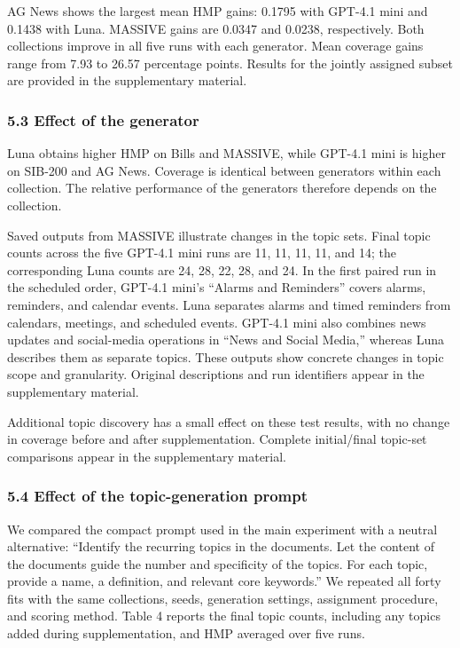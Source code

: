 \documentclass[
  11pt,
  a4paper,
]{article}
\begin{document}
AG News shows the largest mean HMP gains: 0.1795 with GPT-4.1 mini and
0.1438 with Luna. MASSIVE gains are 0.0347 and 0.0238, respectively.
Both collections improve in all five runs with each generator. Mean
coverage gains range from 7.93 to 26.57 percentage points. Results for
the jointly assigned subset are provided in the supplementary material.

\subsubsection{5.3 Effect of the
generator}\label{effect-of-the-generator}

Luna obtains higher HMP on Bills and MASSIVE, while GPT-4.1 mini is
higher on SIB-200 and AG News. Coverage is identical between generators
within each collection. The relative performance of the generators
therefore depends on the collection.

Saved outputs from MASSIVE illustrate changes in the topic sets. Final
topic counts across the five GPT-4.1 mini runs are 11, 11, 11, 11, and
14; the corresponding Luna counts are 24, 28, 22, 28, and 24. In the
first paired run in the scheduled order, GPT-4.1 mini's ``Alarms and
Reminders'' covers alarms, reminders, and calendar events. Luna
separates alarms and timed reminders from calendars, meetings, and
scheduled events. GPT-4.1 mini also combines news updates and
social-media operations in ``News and Social Media,'' whereas Luna
describes them as separate topics. These outputs show concrete changes
in topic scope and granularity. Original descriptions and run
identifiers appear in the supplementary material.

Additional topic discovery has a small effect on these test results,
with no change in coverage before and after supplementation. Complete
initial/final topic-set comparisons appear in the supplementary
material.

\subsubsection{5.4 Effect of the topic-generation
prompt}\label{effect-of-the-topic-generation-prompt}

We compared the compact prompt used in the main experiment with a
neutral alternative: ``Identify the recurring topics in the documents.
Let the content of the documents guide the number and specificity of the
topics. For each topic, provide a name, a definition, and relevant core
keywords.'' We repeated all forty fits with the same collections, seeds,
generation settings, assignment procedure, and scoring method. Table 4
reports the final topic counts, including any topics added during
supplementation, and HMP averaged over five runs.
\end{document}
